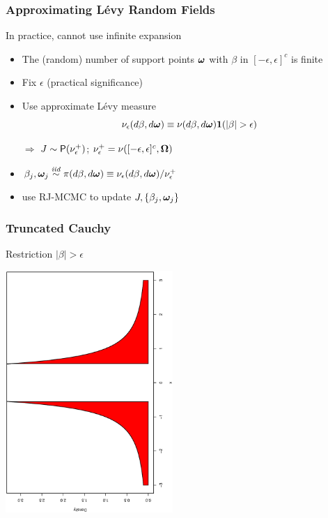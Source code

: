 \documentclass[dvips]{beamer}
\newcommand{\bs}[2]{\begin{frame} \frametitle{#1} 
{#2}
\end{frame} }
\begin{document}
\bs{Approximating L\'evy Random Fields} {
In practice, cannot use infinite expansion
\begin{itemize}
 \item The (random) number of support points $\bm \omega$ with $\beta$ in $[-\epsilon, \epsilon]^c$ is finite
\item Fix $\epsilon$  (practical significance)
\item Use approximate L\'evy  measure 
$$\nu_{\epsilon}(d\beta, d\bm \omega) \equiv \nu(d\beta, d\bm \omega){\bm 1}(|\beta| > \epsilon)$$
\item[$\Rightarrow$] $J \sim \mbox{\sf P}(\nu_{\epsilon}^+)$;
  $\nu^+_{\epsilon} = \nu([-\epsilon, \epsilon]^c, \bm \Omega)$
\item $\beta_j, \bm \omega_j \mathrel{\mathop{\sim}\limits^{\mathit{iid}}} \pi(d\beta, d\bm \omega) \equiv \nu_\epsilon(d\beta , d\bm \omega)/\nu^+_{\epsilon}$

\item use RJ-MCMC to update $J, \{\beta_j, \bm \omega_j\}$
\end{itemize}
}
\bs{Truncated Cauchy} {
\centerline{Restriction  $|\beta| > \epsilon$}
\psfrag{x}{\small{$\beta$}}
\centerline{\includegraphics[width=2.5in,angle=270]{../eps/cauchy1.ps}}
}
\end{document}
